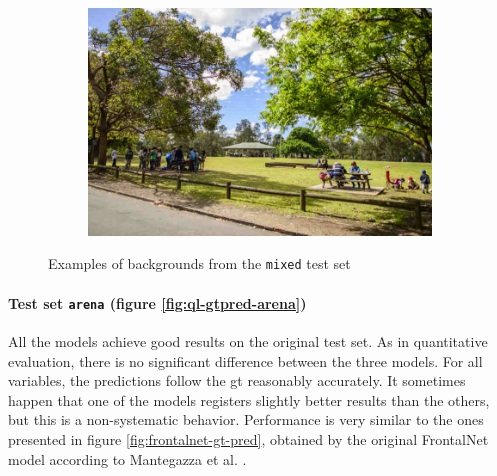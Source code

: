 \begin{figure}[!h]
\begin{center}
\begin{subfigure}[h]{0.24\textwidth}
		\end{subfigure}
		\hfill
		\begin{subfigure}[h]{0.24\textwidth}
			\centering
			\includegraphics[width=1\textwidth]{"contents/images/06-img-park"}
		\end{subfigure}
	\end{center}
	\vspace{-0.5cm}
	\caption[Examples of backgrounds from the \texttt{mixed} test set]{Examples of backgrounds from the \texttt{mixed} test set}
	\label{fig:ql-mixedset}
\end{figure}

\paragraph*{Test set \texttt{arena} (figure \ref{fig:ql-gtpred-arena})}

All the models achieve good results on the original test set. As in quantitative evaluation, there is no significant difference between the three models. For all variables, the predictions follow the \gls{gt} reasonably accurately. It sometimes happen that one of the models registers slightly better results than the others, but this is a non-systematic behavior. Performance is very similar to the ones presented in figure \ref{fig:frontalnet-gt-pred}, obtained by the original FrontalNet model according to Mantegazza et al. \cite{mantegazza2019visionbased}.

